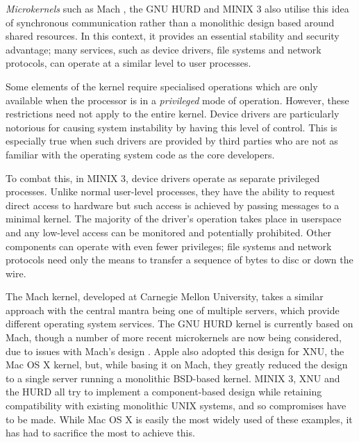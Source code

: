 \emph{Microkernels} such as Mach \cite{mach}, the GNU HURD \cite{hurd}
and MINIX 3 \cite{minix3} also utilise this idea of synchronous
communication rather than a monolithic design based around shared
resources.  In this context, it provides an essential stability and
security advantage; many services, such as device drivers, file
systems and network protocols, can operate at a similar level to user
processes.

Some elements of the kernel require specialised operations which are
only available when the processor is in a \emph{privileged} mode of
operation.  However, these restrictions need not apply to the entire
kernel.  Device drivers are particularly notorious for causing system
instability by having this level of control.  This is especially true
when such drivers are provided by third parties who are not as
familiar with the operating system code as the core developers.

To combat this, in MINIX 3, device drivers operate as separate
privileged processes.  Unlike normal user-level processes, they have
the ability to request direct access to hardware but such access is
achieved by passing messages to a minimal kernel.  The majority of the
driver's operation takes place in userspace and any low-level access
can be monitored and potentially prohibited.  Other components can
operate with even fewer privileges; file systems and network protocols
need only the means to transfer a sequence of bytes to disc or down
the wire.

The Mach kernel, developed at Carnegie Mellon University, takes a
similar approach with the central mantra being one of multiple
servers, which provide different operating system services.  The GNU
HURD kernel is currently based on Mach, though a number of more recent
microkernels are now being considered, due to issues with Mach's
design \cite{hurd:critique}.  Apple also adopted this design for XNU,
the Mac OS X kernel, but, while basing it on Mach, they greatly
reduced the design to a single server running a monolithic BSD-based
kernel.  MINIX 3, XNU and the HURD all try to implement a
component-based design while retaining compatibility with existing
monolithic UNIX systems, and so compromises have to be made.  While
Mac OS X is easily the most widely used of these examples, it has had
to sacrifice the most to achieve this.


